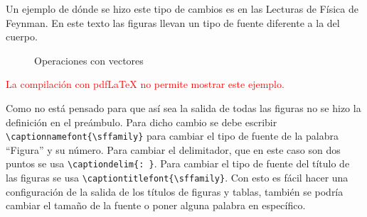 Un ejemplo de dónde se hizo este tipo de cambios es en las Lecturas de Física
de Feynman. En este texto las figuras llevan un tipo de fuente diferente a la
del cuerpo.
\ifluatex%
\begin{figure}[h]
\centering
\begin{minipage}{0.4\linewidth}
\centering
{}

  \captionnamefont{\sffamily}
  \label{fig:vect1}
\end{minipage}
\hfill
\begin{minipage}{0.4\linewidth}
\centering
{}

  \captionnamefont{\sffamily}
  \label{fig:vect2}
\end{minipage}
  \captionnamefont{\sffamily}
  \caption{\sffamily Operaciones con vectores}
  \label{fig:vect}
\end{figure}
\else
\ifpdftex%
\begin{center}
\textcolor{red}{La compilación con pdf\LaTeX{} no permite mostrar este
ejemplo.}
\end{center}
\fi
\fi

Como no está pensado para que así sea la salida de todas las figuras no se
hizo la definición en el preámbulo. Para dicho cambio se debe escribir
\verb|\captionnamefont{\sffamily}| para cambiar el tipo de fuente de la
palabra ``Figura'' y su número. Para cambiar el delimitador, que en este caso
son dos puntos se usa \verb|\captiondelim{: }|. Para cambiar el tipo de
fuente del título de las figuras se usa \verb|\captiontitlefont{\sffamily}|.
Con esto es fácil hacer una configuración de la salida de los títulos de
figuras y tablas, también se podría cambiar el tamaño de la fuente o poner
alguna palabra en específico.

